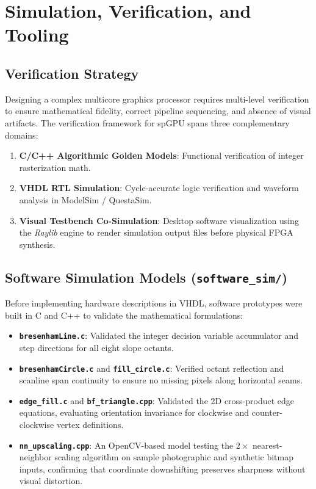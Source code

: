 \chapter{Simulation, Verification, and Tooling}
\label{chap:simulation_verification}

\section{Verification Strategy}
Designing a complex multicore graphics processor requires multi-level verification to ensure mathematical fidelity, correct pipeline sequencing, and absence of visual artifacts. The verification framework for spGPU spans three complementary domains:
\begin{enumerate}
    \item \textbf{C/C++ Algorithmic Golden Models}: Functional verification of integer rasterization math.
    \item \textbf{VHDL RTL Simulation}: Cycle-accurate logic verification and waveform analysis in ModelSim / QuestaSim.
    \item \textbf{Visual Testbench Co-Simulation}: Desktop software visualization using the \textit{Raylib} engine to render simulation output files before physical FPGA synthesis.
\end{enumerate}

\section{Software Simulation Models (\texttt{software\_sim/})}
Before implementing hardware descriptions in VHDL, software prototypes were built in C and C++ to validate the mathematical formulations:
\begin{itemize}
    \item \textbf{\texttt{bresenhamLine.c}}: Validated the integer decision variable accumulator and step directions for all eight slope octants.
    \item \textbf{\texttt{bresenhamCircle.c}} and \textbf{\texttt{fill\_circle.c}}: Verified octant reflection and scanline span continuity to ensure no missing pixels along horizontal seams.
    \item \textbf{\texttt{edge\_fill.c}} and \textbf{\texttt{bf\_triangle.cpp}}: Validated the 2D cross-product edge equations, evaluating orientation invariance for clockwise and counter-clockwise vertex definitions.
    \item \textbf{\texttt{nn\_upscaling.cpp}}: An OpenCV-based model testing the $2\times$ nearest-neighbor scaling algorithm on sample photographic and synthetic bitmap inputs, confirming that coordinate downshifting preserves sharpness without visual distortion.
\end{itemize}

